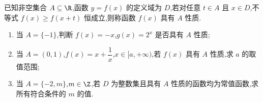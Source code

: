 \begin{problem}
已知非空集合 \(A\subseteq\R\),函数 \(y=f(x)\) 的定义域为 \(D\),若对任意 \(t\in A\) 且 \(x\in D\),不等式 \(f(x)\geq f(x+t)\) 恒成立,则称函数 \(f(x)\) 具有 \(A\) 性质.
\begin{enumerate}
\item 当 \(A=\{-1\}\),判断 \(f(x)=-x\),\(g(x)=2^x\) 是否具有 \(A\) 性质;
\item 当 \(A=(0,1)\),\(f(x)=x+\dfrac{1}{x}\),\(x\in[a,+\infty)\),若 \(f(x)\) 具有 \(A\) 性质,求 \(a\) 的取值范围;
\item 当 \(A=\{-2,m\}\),\(m\in\Z\),若 \(D\) 为整数集且具有 \(A\) 性质的函数均为常值函数,求所有符合条件的 \(m\) 的值.
\end{enumerate}
\end{problem}

